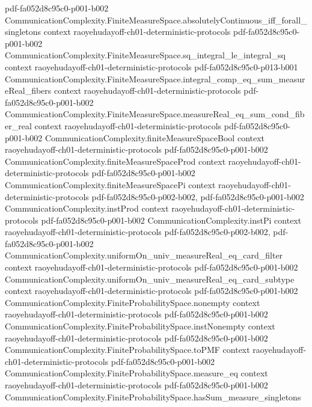 \begin{theorem}
  {pdf-fa052d8c95c0-p001-b002}
\proofstep
  {CommunicationComplexity.FiniteMeasureSpace.absolutelyContinuous_iff_forall_singletons}
  {context}
  {raoyehudayoff-ch01-deterministic-protocols}
  {pdf-fa052d8c95c0-p001-b002}
\proofstep
  {CommunicationComplexity.FiniteMeasureSpace.sq_integral_le_integral_sq}
  {context}
  {raoyehudayoff-ch01-deterministic-protocols}
  {pdf-fa052d8c95c0-p013-b001}
\proofstep
  {CommunicationComplexity.FiniteMeasureSpace.integral_comp_eq_sum_measureReal_fibers}
  {context}
  {raoyehudayoff-ch01-deterministic-protocols}
  {pdf-fa052d8c95c0-p001-b002}
\proofstep
  {CommunicationComplexity.FiniteMeasureSpace.measureReal_eq_sum_cond_fiber_real}
  {context}
  {raoyehudayoff-ch01-deterministic-protocols}
  {pdf-fa052d8c95c0-p001-b002}
\proofstep
  {CommunicationComplexity.finiteMeasureSpaceBool}
  {context}
  {raoyehudayoff-ch01-deterministic-protocols}
  {pdf-fa052d8c95c0-p001-b002}
\proofstep
  {CommunicationComplexity.finiteMeasureSpaceProd}
  {context}
  {raoyehudayoff-ch01-deterministic-protocols}
  {pdf-fa052d8c95c0-p001-b002}
\proofstep
  {CommunicationComplexity.finiteMeasureSpacePi}
  {context}
  {raoyehudayoff-ch01-deterministic-protocols}
  {pdf-fa052d8c95c0-p002-b002,
    pdf-fa052d8c95c0-p001-b002}
\proofstep
  {CommunicationComplexity.instProd}
  {context}
  {raoyehudayoff-ch01-deterministic-protocols}
  {pdf-fa052d8c95c0-p001-b002}
\proofstep
  {CommunicationComplexity.instPi}
  {context}
  {raoyehudayoff-ch01-deterministic-protocols}
  {pdf-fa052d8c95c0-p002-b002,
    pdf-fa052d8c95c0-p001-b002}
\proofstep
  {CommunicationComplexity.uniformOn_univ_measureReal_eq_card_filter}
  {context}
  {raoyehudayoff-ch01-deterministic-protocols}
  {pdf-fa052d8c95c0-p001-b002}
\proofstep
  {CommunicationComplexity.uniformOn_univ_measureReal_eq_card_subtype}
  {context}
  {raoyehudayoff-ch01-deterministic-protocols}
  {pdf-fa052d8c95c0-p001-b002}
\proofstep
  {CommunicationComplexity.FiniteProbabilitySpace.nonempty}
  {context}
  {raoyehudayoff-ch01-deterministic-protocols}
  {pdf-fa052d8c95c0-p001-b002}
\proofstep
  {CommunicationComplexity.FiniteProbabilitySpace.instNonempty}
  {context}
  {raoyehudayoff-ch01-deterministic-protocols}
  {pdf-fa052d8c95c0-p001-b002}
\proofstep
  {CommunicationComplexity.FiniteProbabilitySpace.toPMF}
  {context}
  {raoyehudayoff-ch01-deterministic-protocols}
  {pdf-fa052d8c95c0-p001-b002}
\proofstep
  {CommunicationComplexity.FiniteProbabilitySpace.measure_eq}
  {context}
  {raoyehudayoff-ch01-deterministic-protocols}
  {pdf-fa052d8c95c0-p001-b002}
\proofstep
  {CommunicationComplexity.FiniteProbabilitySpace.hasSum_measure_singletons}

\end{theorem}
